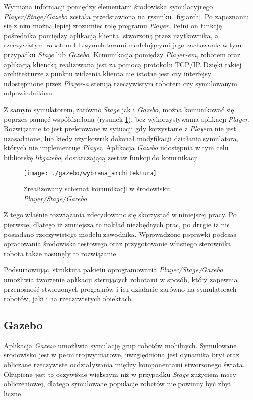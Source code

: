 	Wymiana informacji pomiędzy elementami środowiska symulacyjnego \textit{Player/Stage/Gazebo} została przedstawiona na 
	rysunku~\ref{fig:arch}.
	Po zapoznaniu się z nim można lepiej zrozumieć rolę programu \textit{Player}. Pełni on funkcję pośrednika pomiędzy aplikacją klienta, stworzoną przez użytkownika,
	a rzeczywistym robotem lub symulatorami modelującymi jego zachowanie w tym przypadku \textit{Stage} lub \textit{Gazebo}. 
	Komunikacja pomiędzy \textit{Player-em}, robotem oraz aplikacją kliencką realizowana jest za pomocą protokołu TCP/IP.
	Dzięki takiej architekturze z punktu widzenia klienta nie istotne jest czy interfejsy udostępnione przez \textit{Player-a} sterują rzeczywistym robotem czy symulowanym odpowiednikiem.
	
	Z samym symulatorem, zarówno \textit{Stage} jak i \textit{Gazebo}, można komunikować się poprzez pamięć współdzieloną (rysunek \ref{fig:wybrana_arch}), bez wykorzystywania aplikacji \textit{Player}. Rozwiązanie to jest 
	preferowane w sytuacji gdy korzystanie z \textit{Playera} nie jest uzasadnione, lub kiedy użytkownik dokonał modyfikacji działania symulatora, których nie implementuje \textit{Player}. 
	Aplikacja \textit{Gazebo} udostępnia w tym celu  bibliotekę \textit{libgazebo}, dostarczającą zestaw funkcji do komunikacji.
	\begin{figure}[h]
	\centering
	\texttt{[image: ./gazebo/wybrana\_architektura]}
	\caption{Zrealizowany schemat komunikacji w środowisku \textit{Player/Stage/Gazebo} \label{fig:wybrana_arch}}
	\end{figure}
	Z tego właśnie rozwiązania zdecydowano się skorzystać w niniejszej pracy. Po pierwsze, dlatego iż zmniejsza to nakład niezbędnych prac, po drugie iż nie posiadano rzeczywistego modelu
	zawodnika. Wprowadzone poprawki podczas opracowania środowiska testowego oraz przygotowanie własnego sterownika robota także nasunęły to rozwiązanie.

	Podsumowując, struktura pakietu oprogramowania \mbox{\textit{Player/Stage/Gazebo}} umożliwia tworzenie aplikacji sterujących robotami w sposób,
	który zapewnia przenośność stworzonych programów i ich działanie zarówno na symulatorach robotów, jaki i na rzeczywistych obiektach.
	
 	\subsection{Gazebo}
 	
 	Aplikacja \textit{Gazebo} umożliwia symulację grup robotów mobilnych. Symulowane
 	środowisko jest w pełni trójwymiarowe, uwzględniona jest dynamika brył oraz obliczane rzeczywiste oddziaływania między komponentami stworzonego świata.
	Okupione jest to oczywiście większym niż w przypadku \textit{Stage} zużyciem mocy obliczeniowej, dlatego symulowane populacje robotów nie powinny być zbyt liczne.
 	 	
